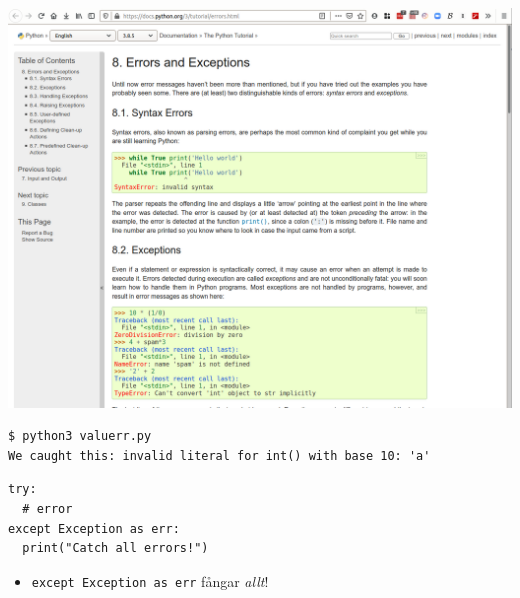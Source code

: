 \begin{frame}
  \includegraphics[width=\columnwidth]{figs/docs-except.png}
\end{frame}

\begin{frame}[fragile]
  \begin{example}
    
  \end{example}

  \pause

  \begin{example}
    \begin{lstlisting}[language={}]
$ python3 valuerr.py
We caught this: invalid literal for int() with base 10: 'a'
    \end{lstlisting}
  \end{example}
\end{frame}

\begin{frame}[fragile]
  \begin{lstlisting}
try:
  # error
except Exception as err:
  print("Catch all errors!")
  \end{lstlisting}
  \begin{remark}
    \begin{itemize}
    \item \lstinline{except Exception as err} fångar \emph{allt}!
  \end{itemize}
  \end{remark}
\end{frame}

\begin{frame}[fragile]
  \begin{example}[manyerr.py]
    
  \end{example}
\end{frame}

